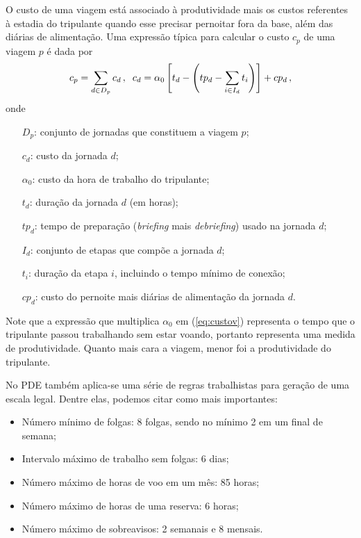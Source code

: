 O custo de uma viagem está associado à produtividade mais os custos referentes à estadia do 
tripulante quando esse precisar pernoitar fora da base, além das diárias de alimentação. Uma 
expressão típica para calcular o custo $c_p$ de uma viagem $p$ é dada por
%
\begin{equation} \label{eq:custov} 
	c_p = \sum_{d \in D_p} c_d \, , \;\;
	c_d = \alpha_0 \left[t_d - \left(tp_d - \sum_{i \in I_d} t_i\right)\right] + cp_d \, ,
\end{equation} 
%
onde
%
\begin{itemize}
	\item[$D_p$:] conjunto de jornadas que constituem a viagem $p$;
	\item[$c_d$:] custo da jornada $d$;
	\item[$\alpha_0$:] custo da hora de trabalho do tripulante;
	\item[$t_d$:] duração da jornada $d$ (em horas);	
	\item[$tp_d$:] tempo de preparação ({\it briefing} mais {\it debriefing}) usado na jornada $d$;
	\item[$I_d$:] conjunto de etapas que compõe a jornada $d$;
	\item[$t_i$:] duração da etapa $i$, incluindo o tempo mínimo de conexão;
	\item[$cp_d$:] custo do pernoite mais diárias de alimentação da jornada $d$.
\end{itemize}
%
Note que a expressão que multiplica $\alpha_0$ em (\ref{eq:custov}) representa o tempo que o
tripulante passou trabalhando sem estar voando, portanto representa uma medida de produtividade.
Quanto mais cara a viagem, menor foi a produtividade do tripulante.

No PDE também aplica-se uma série de regras trabalhistas para geração de uma escala legal. Dentre 
elas, podemos citar como mais importantes:

\begin{itemize}
	\item Número mínimo de folgas: 8 folgas, sendo no mínimo 2 em um final de semana;
	\item Intervalo máximo de trabalho sem folgas: 6 dias;
	\item Número máximo de horas de voo em um mês: 85 horas;
	\item Número máximo de horas de uma reserva: 6 horas;
	\item Número máximo de sobreavisos: 2 semanais e 8 mensais.
\end{itemize}

